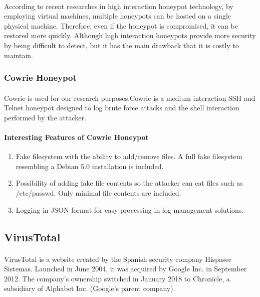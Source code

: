 \documentclass{report}
\begin{document}
\paragraph{}
According to recent researches in high interaction honeypot technology, by employing virtual machines, multiple honeypots can be hosted on a single physical machine. Therefore, even if the honeypot is compromised, it can be restored more quickly. Although high interaction honeypots provide more security by being difficult to detect, but it has the main drawback that it is costly to maintain.

\subsubsection{Cowrie Honeypot}
\paragraph{}
Cowrie is used for our research purposes.Cowrie is a medium interaction SSH and Telnet honeypot designed to log brute force attacks and the shell interaction performed by the attacker.
\paragraph{Interesting Features of Cowrie Honeypot}

\begin{enumerate}
\item Fake filesystem with the ability to add/remove files. A full fake filesystem resembling a Debian 5.0 installation is included.
\item Possibility of adding fake file contents so the attacker can cat files such as /etc/passwd. Only minimal file contents are included.
\item Logging in JSON format for easy processing in log management solutions.
\end{enumerate}

\subsection{VirusTotal}
\paragraph{}
VirusTotal is a website created by the Spanish security company Hispasec Sistemas. Launched in June 2004, it was acquired by Google Inc. in September 2012. The company's ownership switched in January 2018 to Chronicle, a subsidiary of Alphabet Inc. (Google's parent company).
\end{document}

